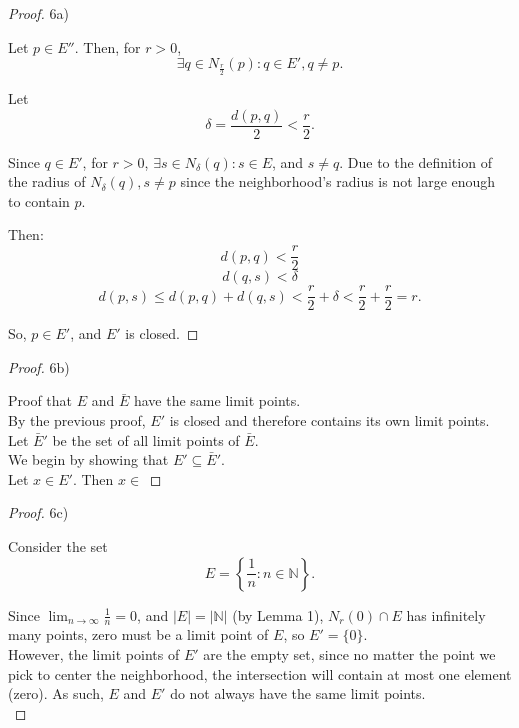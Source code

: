 \documentclass[10pt]{article}
\theoremstyle{definition}
\theoremstyle{plain}
\newcommand{\N}{\mathbb{N}}
\begin{document}
\begin{proof}
6a)

Let $p\in E''$. Then, for $r>0$,
$$\exists q\in N_{\frac{r}{2}} (p):q\in E', q\neq p.$$

Let
$$\delta = \frac{d(p,q)}{2} < \frac{r}{2}.$$

Since $q\in E'$, for $r>0$, $\exists s\in N_\delta (q): s\in E$, and  $s\neq q$. Due to the definition of the radius of $N_\delta (q), s\neq p$ since the neighborhood's radius is not large enough to contain $p$.

Then:
$$d(p,q) < \frac{r}{2}$$
$$d(q,s) < \delta$$
$$d(p,s) \leq d(p,q) + d(q,s) < \frac{r}{2} + \delta < \frac{r}{2} + \frac{r}{2} = r.$$

So, $p\in E'$, and $E'$ is closed.
\end{proof}

\begin{proof}
6b)

Proof that $E$ and $\bar{E}$ have the same limit points. \\

By the previous proof, $E'$ is closed and therefore contains its own limit points. \\

Let $\bar{E}'$ be the set of all limit points of $\bar{E}$. \\

We begin by showing that $E'\subseteq \bar{E}'$. \\

Let $x\in E'$. Then $x\in  $

\end{proof}

\begin{proof}
 6c)

  Consider the set
  $$E = \left\{\frac{1}{n}: n\in\N\right\}.$$

  Since $\lim_{n\rightarrow\infty} \frac{1}{n} = 0$, and $|E|=|\N|$ (by Lemma 1), $N_r (0)\cap E$ has infinitely many points, zero must be a limit point of $E$, so $E' = \{0\}$. \\

  However, the limit points of $E'$ are the empty set, since no matter the point we pick to center the neighborhood, the intersection will contain at most one element (zero). As such, $E$ and $E'$ do not always have the same limit points. \\
\end{proof}
\end{document}
